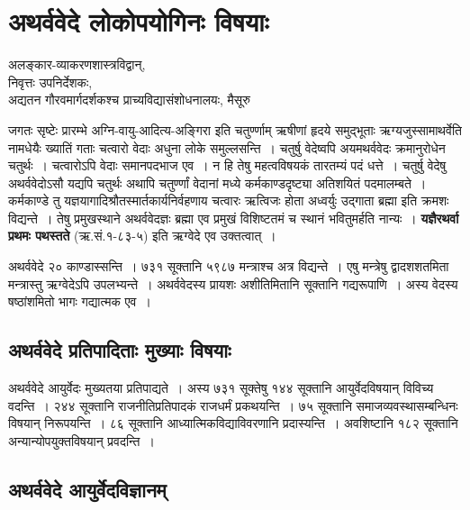{\fontsize{15}{17}\selectfont
\presetvalues
\chapter{अथर्ववेदे लोकोपयोगिनः विषयाः}

\begin{center}
\smallskip

अलङ्कार-व्याकरणशास्त्रविद्वान्,\\ 
निवृत्तः उपनिर्देशकः, \\
अद्यतन गौरवमार्गदर्शकश्च प्राच्यविद्यासंशोधनालयः, मैसूरु
\addrule
\end{center}
\vskip -10pt

जगतः सृष्टेः प्रारम्भे अग्नि-वायु-आदित्य-अङ्गिरा इति चतुर्ण्णाम् ऋषीणां हृदये समुद्भूताः ऋग्यजुस्सामाथर्वेति नामधेयैः ख्यातिं गताः चत्वारो वेदाः अधुना लोके समुल्लसन्ति~। चतुर्षु वेदेष्वपि अयमथर्ववेदः क्रमानुरोधेन चतुर्थः~। चत्वारोऽपि वेदाः समानपदभाज एव~। न हि तेषु महत्वविषयकं तारतम्यं पदं धत्ते~। चतुर्षु वेदेषु अथर्ववेदोऽसौ यद्यपि चतुर्थः अथापि चतुर्ण्णां वेदानां मध्ये कर्मकाण्डदृष्ट्या अतिशयितं पदमालम्बते~। कर्मकाण्डे तु यज्ञयागादिश्रौतस्मार्तकार्यनिर्वहणाय चत्वारः ऋत्विजः होता अध्वर्युः उद्गाता ब्रह्मा इति क्रमशः विद्यन्ते~। तेषु प्रमुखस्थाने अथर्ववेदज्ञः ब्रह्मा एव प्रमुखं विशिष्टतमं च स्थानं भवितुमर्हति नान्यः~। \textbf{यज्ञैरथर्वा प्रथमः पथस्तते} (ऋ.सं.१-८३-५) इति ऋग्वेदे एव उक्तत्वात्~। 

अथर्ववेदे २० काण्डास्सन्ति~। ७३१ सूक्तानि ५९८७ मन्त्राश्च अत्र विद्यन्ते~। एषु मन्त्रेषु द्वादशशतमिता मन्त्रास्तु ऋग्वेदेऽपि उपलभ्यन्ते~। अथर्ववेदस्य प्रायशः अशीतिमितानि सूक्तानि गद्यरूपाणि~। अस्य वेदस्य षष्ठांशमितो भागः गद्यात्मक एव~। 

\section*{अथर्ववेदे प्रतिपादिताः मुख्याः विषयाः}

अथर्ववेदे आयुर्वेदः मुख्यतया प्रतिपाद्यते~। अस्य ७३१ सूक्तेषु १४४ सूक्तानि आयुर्वेदविषयान् विविच्य वदन्ति~। २४४ सूक्तानि राजनीतिप्रतिपादकं राजधर्मं प्रकथयन्ति~। ७५ सूक्तानि समाजव्यवस्थासम्बन्धिनः विषयान् निरूपयन्ति~। ८६ सूक्तानि आध्यात्मिकविद्याविवरणानि प्रदास्यन्ति~। अवशिष्टानि १८२ सूक्तानि अन्यान्योपयुक्तविषयान् प्रवदन्ति~। 

\section*{अथर्ववेदे आयुर्वेदविज्ञानम्}

}

